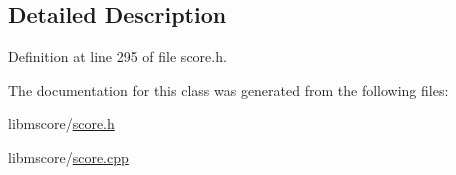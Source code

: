 \subsection{Detailed Description}


Definition at line 295 of file score.\+h.



The documentation for this class was generated from the following files\+:\begin{DoxyCompactItemize}
\item 
libmscore/\hyperlink{score_8h}{score.\+h}\item 
libmscore/\hyperlink{score_8cpp}{score.\+cpp}\end{DoxyCompactItemize}
